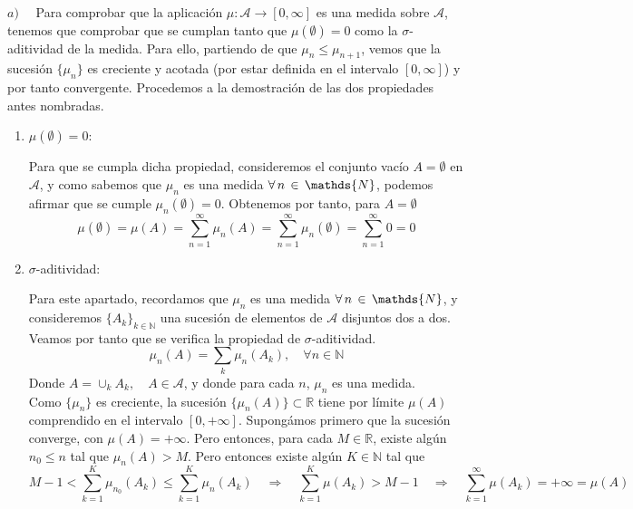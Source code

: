 \documentclass[fleqn]{article}
\def\R{\mathds{R}}
\def\N{\mathds{N}}
\begin{document}
    $a) \quad$ Para comprobar que la aplicación $\mu : \mathcal{A} \longrightarrow [0,\infty]$ es una medida sobre $\mathcal{A}$, tenemos que 
    comprobar que se cumplan tanto que $\mu(\emptyset)=0$ como la $\sigma$-aditividad de la medida. Para ello, partiendo de que 
    $\mu_n \leq \mu_{n+1}$, vemos que la sucesión $\{\mu_n\}$ es creciente y acotada (por estar definida en el intervalo $[0,\infty]$) y 
    por tanto convergente. Procedemos a la demostración de las dos propiedades antes nombradas.
    \begin{enumerate}
        \item $\mu(\emptyset)=0$: 
    
                Para que se cumpla dicha propiedad, consideremos el conjunto 
                vacío $A=\emptyset$ en $\mathcal{A}$, y como sabemos que $\mu_n$ es una medida $\forall \thinspace n \thinspace \in \thinspace \N$,
                podemos afirmar que se cumple $\mu_n(\emptyset)=0$. Obtenemos por tanto, para $A=\emptyset$
                $$\mu(\emptyset) = \mu(A) = \sum_{n=1}^{\infty} \mu_n(A) = \sum_{n=1}^{\infty} \mu_n(\emptyset) = \sum_{n=1}^{\infty} 0 = 0 $$
        \item $\sigma$-aditividad: 

                Para este apartado, recordamos que $\mu_n$ es una medida $\forall \thinspace n \thinspace \in \thinspace \N$, y consideremos $\{A_k\}_{k\in\N}$
                una sucesión de elementos de $\mathcal{A}$ disjuntos dos a dos. Veamos por tanto que se verifica la propiedad de $\sigma$-aditividad.
                $$\mu_n(A) = \sum_k \mu_n (A_k), \quad \forall n \in \N$$
                Donde $A = \cup_k A_k, \quad A \in \mathcal{A}$, y donde para cada $n$, $\mu_n$ es una medida.\\
                Como $\{\mu_n\}$ es creciente, la sucesión $\{\mu_n(A)\} \subset \R$ tiene por límite $\mu(A)$ comprendido en el intervalo $[0,+\infty]$.
                Supongámos primero que la sucesión converge, con $\mu(A)= +\infty$. Pero entonces, para cada $M \in \R$, existe algún $n_0 \leq n$ tal que
                $\mu_n(A)>M$. Pero entonces existe algún $K \in \N$ tal que
                $$M-1 < \sum_{k=1}^K \mu_{n_0} (A_k) \leq \sum_{k=1}^K \mu_{n} (A_k) \quad \Rightarrow \quad \sum_{k=1}^K \mu (A_k) > M-1 \quad \Rightarrow \quad \sum_{k=1}^{\infty} \mu (A_k) = +\infty = \mu(A) $$ 


\end{enumerate}
\end{document}
